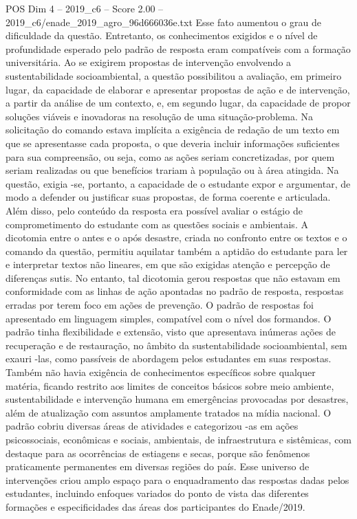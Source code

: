 \begin{textsample}{POS Dim 4 – 2019\_c6 – Score 2.00 – 2019\_c6/enade\_2019\_agro\_96d666036e.txt}
Esse fato aumentou o grau de dificuldade da questão.
Entretanto, os conhecimentos exigidos e o nível de profundidade esperado pelo padrão de resposta eram compatíveis com a formação universitária.
Ao se exigirem propostas de intervenção envolvendo a sustentabilidade socioambiental, a questão possibilitou a avaliação, em primeiro lugar, da capacidade de elaborar e apresentar propostas de ação e de intervenção, a partir da análise de um contexto, e, em segundo lugar, da capacidade de propor soluções viáveis e inovadoras na resolução de uma situação-problema.
Na solicitação do comando estava implícita a exigência de redação de um texto em que se apresentasse cada proposta, o que deveria incluir informações suficientes para sua compreensão, ou seja, como as ações seriam concretizadas, por quem seriam realizadas ou que benefícios trariam à população ou à área atingida.
Na questão, exigia -se, portanto, a capacidade de o estudante expor e argumentar, de modo a defender ou justificar suas propostas, de forma coerente e articulada.
Além disso, pelo conteúdo da resposta era possível avaliar o estágio de comprometimento do estudante com as questões sociais e ambientais.
A dicotomia entre o antes e o após desastre, criada no confronto entre os textos e o comando da questão, permitiu aquilatar também a aptidão do estudante para ler e interpretar textos não lineares, em que são exigidas atenção e percepção de diferenças sutis.
No entanto, tal dicotomia gerou respostas que não estavam em conformidade com as linhas de ação apontadas no padrão de resposta, respostas erradas por terem foco em ações de prevenção.
O padrão de respostas foi apresentado em linguagem simples, compatível com o nível dos formandos.
O padrão tinha flexibilidade e extensão, visto que apresentava inúmeras ações de recuperação e de restauração, no âmbito da sustentabilidade socioambiental, sem exauri -las, como passíveis de abordagem pelos estudantes em suas respostas.
Também não havia exigência de conhecimentos específicos sobre qualquer matéria, ficando restrito aos limites de conceitos básicos sobre meio ambiente, sustentabilidade e intervenção humana em emergências provocadas por desastres, além de atualização com assuntos amplamente tratados na mídia nacional.
O padrão cobriu diversas áreas de atividades e categorizou -as em ações psicossociais, econômicas e sociais, ambientais, de infraestrutura e sistêmicas, com destaque para as ocorrências de estiagens e secas, porque são fenômenos praticamente permanentes em diversas regiões do país.
Esse universo de intervenções criou amplo espaço para o enquadramento das respostas dadas pelos estudantes, incluindo enfoques variados do ponto de vista das diferentes formações e especificidades das áreas dos participantes do Enade/2019.

\end{textsample}

